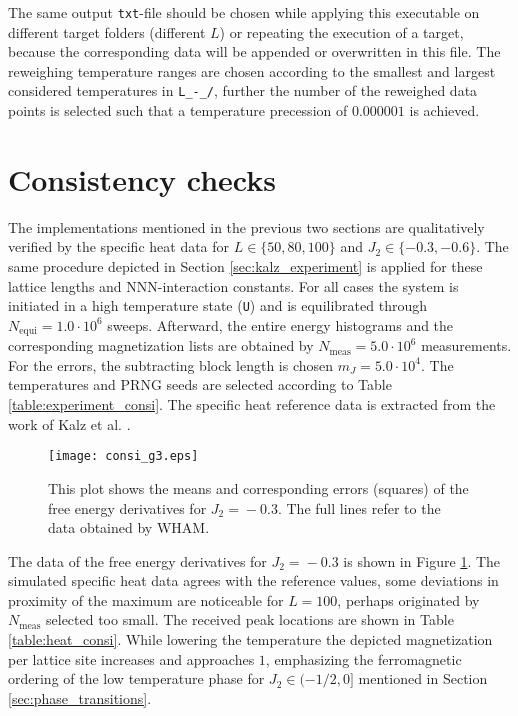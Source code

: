 The same output \verb|txt|-file should be chosen while applying this executable on different target folders (different $L$) or repeating the execution 
of a target, because the corresponding data will be appended or overwritten in this file.
The reweighing temperature ranges are chosen according to the smallest and largest considered temperatures in \verb|L_-_/|, further the number of the reweighed 
data points is selected such that a temperature precession of $0.000001$ is achieved. 



\section{Consistency checks}
\label{sec:kalz_checks}

The implementations mentioned in the previous two sections are qualitatively verified by the specific heat data for $L\!\in\!\{50,80,100\}$ and 
$J_2\!\in\!\{-0.3,-0.6\}$. The same procedure depicted in Section \ref{sec:kalz_experiment} is applied for these lattice lengths and NNN-interaction
constants. For all cases the system is initiated in a high temperature state (\verb|U|) and is equilibrated through 
$N_\mathrm{equi}\!=\!1.0\cdot10^{6}$ sweeps. Afterward, the entire energy histograms and the corresponding magnetization lists are obtained by 
$N_\mathrm{meas}\!=\!5.0\cdot10^{6}$ measurements. For the errors, the subtracting block length is chosen $m_J\!=\!5.0\cdot10^{4}$. The temperatures and 
PRNG seeds are selected according to Table \ref{table:experiment_consi}. The specific heat reference data is extracted from the work of Kalz et al. 
\cite{Kalz2008}. 

\begin{figure}[!h]
  \texttt{[image: consi\_g3.eps]}
  \caption{This plot shows the means and corresponding errors (squares) of the free energy derivatives for $J_2\!=\!-0.3$.
           The full lines refer to the data obtained by WHAM.}
  \label{fig:consi_g3}
\end{figure}

The data of the free energy derivatives for $J_2\!=\!-0.3$ is shown in Figure \ref{fig:consi_g3}. The simulated specific heat data agrees with the reference
values, some deviations in proximity of the maximum are noticeable for $L\!=\!100$, perhaps originated by $N_\mathrm{meas}$ selected too small. The received peak 
locations are shown in Table \ref{table:heat_consi}. While lowering the temperature the depicted magnetization per lattice site increases and approaches $1$, 
emphasizing the ferromagnetic ordering of the low temperature phase for $J_2\!\in\!(-1/2,0]$ mentioned in Section \ref{sec:phase_transitions}. 

